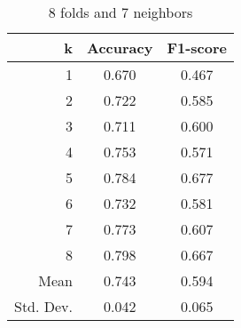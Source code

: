 \begin{table}
\centering
\caption{8 folds and 7 neighbors}
\begin{tabular}{rcc}
\toprule
         k &  Accuracy &  F1-score \\
\midrule
         1 &     0.670 &     0.467 \\
         2 &     0.722 &     0.585 \\
         3 &     0.711 &     0.600 \\
         4 &     0.753 &     0.571 \\
         5 &     0.784 &     0.677 \\
         6 &     0.732 &     0.581 \\
         7 &     0.773 &     0.607 \\
         8 &     0.798 &     0.667 \\
      Mean &     0.743 &     0.594 \\
 Std. Dev. &     0.042 &     0.065 \\
\bottomrule
\end{tabular}
\end{table}
